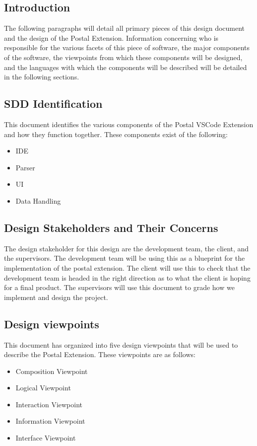 \documentclass[letterpaper,10pt,titlepage,draftclsnofoot,onecolumn,onesided] {IEEEtran}
\begin{document}
\subsection{Introduction}
The following paragraphs will detail all primary pieces of this design document and the design of the Postal Extension. 
Information concerning who is responsible for the various facets of this piece of software, the major components of the software, the viewpoints from which these components will be designed, and the languages with which the components will be described will be detailed in the following sections.

\subsection{SDD Identification}
This document identifies the various components of the Postal VSCode Extension and how they function together. These components exist of the following:
\begin{itemize}
\item IDE
\item Parser
\item UI
\item Data Handling
\end{itemize}

\subsection{Design Stakeholders and Their Concerns}
The design stakeholder for this design are the development team, the client, and the supervisors.
The development team will be using this as a blueprint for the implementation of the postal extension. 
The client will use this to check that the development team is headed in the right direction as to what the client is hoping for a final product.
The supervisors will use this document to grade how we implement and design the project.

\subsection{Design viewpoints}
This document has organized into five design viewpoints that will be used to describe the Postal Extension.
These viewpoints are as follows:
\begin {itemize}
\item Composition Viewpoint
\item Logical Viewpoint
\item Interaction Viewpoint
\item Information Viewpoint
\item Interface Viewpoint
\end {itemize}
\end{document}

